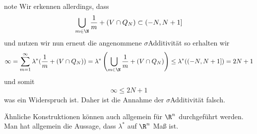 \documentclass[letterpaper,10pt,english]{jupyterBook}
\begin{document}
\begin{sphinxadmonition}{note}
Wir erkennen allerdings, dass
\begin{equation*}
\begin{split}\bigcup_{m\in\N} \frac{1}{m}+(V\cap Q_N) \subset (-N,N+1]\end{split}
\end{equation*}
\sphinxAtStartPar
und nutzen wir nun erneut die angenommene \(\sigma\)\sphinxhyphen{}Additivität so erhalten wir
\begin{equation*}
\begin{split}\infty = \sum_{m=1}^\infty \lambda^\ast(\frac{1}{m}+(V\cap Q_N)) = 
\lambda^\ast\left(\bigcup_{m\in\N}  \frac{1}{m}+(V\cap Q_N) \right)\leq 
\lambda^\ast((-N,N+1]) = 2N + 1\end{split}
\end{equation*}
\sphinxAtStartPar
und somit
\begin{equation*}
\begin{split}\infty \leq 2N + 1\end{split}
\end{equation*}
\sphinxAtStartPar
was ein Widerspruch ist. Daher ist die Annahme der \(\sigma\)\sphinxhyphen{}Additivität falsch.
\end{sphinxadmonition}

\sphinxAtStartPar
Ähnliche Konstruktionen können auch allgemein für \(\R^n\) durchgeführt werden. Man hat allgemein die Aussage, dass \(\lambda^\ast\) auf \(\R^n\)  Maß ist.
\end{document}
